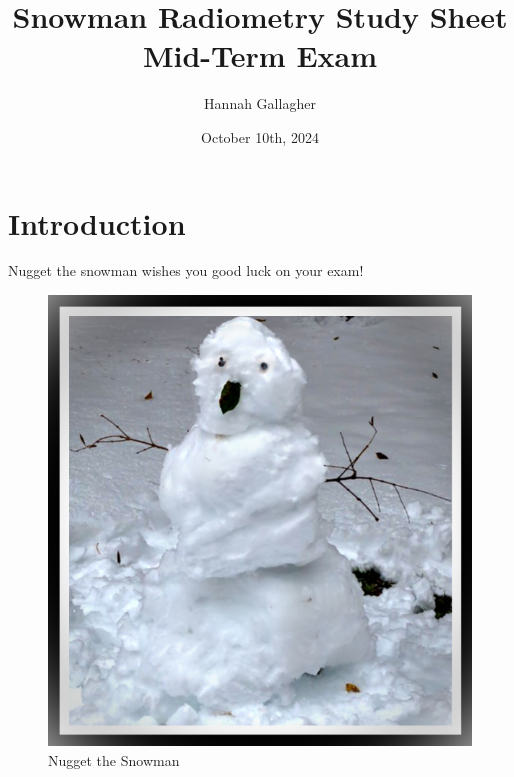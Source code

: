 \documentclass{article}
\title{Snowman Radiometry Study Sheet Mid-Term Exam}
\author{Hannah Gallagher}
\date{October 10th, 2024}
\begin{document}
\maketitle

\section{Introduction}




Nugget the snowman wishes you good luck on your exam!

\begin{figure}[h!]
\centering
\includegraphics[scale=1]{Nugget.jpg}
\caption{Nugget the Snowman}
\label{fig:Nugget}
\end{figure}
\end{document}
